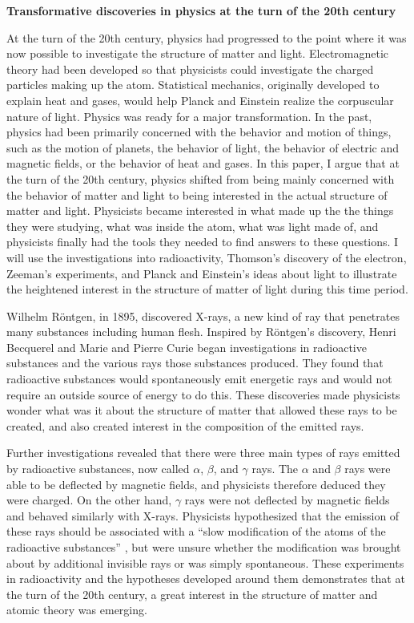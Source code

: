 \documentclass[12pt, oneside, letterpaper, fleqn]{article}
\begin{document}
\begin{center}
\textbf{Transformative discoveries in physics at the turn of the 20th
century}
\end{center}

At the turn of the 20th century, physics had progressed to the point
where it was now possible to investigate the structure of matter and
light. Electromagnetic theory had been developed so that physicists
could investigate the charged particles making up the atom. Statistical
mechanics, originally developed to explain heat and gases, would help
Planck and Einstein realize the corpuscular nature of light. Physics was
ready for a major transformation. In the past, physics had been
primarily concerned with the behavior and motion of things, such as the
motion of planets, the behavior of light, the behavior of electric and
magnetic fields, or the behavior of heat and gases. In this paper, I
argue that at the turn of the 20th century, physics shifted from being
mainly concerned with the behavior of matter and light to being
interested in the actual structure of matter and light. Physicists
became interested in what made up the the things they were studying,
what was inside the atom, what was light made of, and physicists finally
had the tools they needed to find answers to these questions. I will
use the investigations into radioactivity, Thomson's discovery of the
electron, Zeeman's experiments, and Planck and Einstein's ideas about
light to illustrate the heightened interest in the structure of matter
of light during this time period.

Wilhelm R\"ontgen, in 1895, discovered X-rays, a new kind of ray that
penetrates many substances including human flesh. Inspired by
R\"ontgen's discovery, Henri Becquerel and Marie and Pierre Curie began
investigations in radioactive substances and the various rays those
substances produced. They found that radioactive substances would
spontaneously emit energetic rays and would not require an outside
source of energy to do this. These discoveries made physicists wonder
what was it about the structure of matter that allowed these rays to be
created, and also created interest in the composition of the emitted
rays.

Further investigations revealed that there were three main types of rays
emitted by radioactive substances, now called $\alpha$, $\beta$, and
$\gamma$ rays. The $\alpha$ and $\beta$ rays were able to be deflected
by magnetic fields, and physicists therefore deduced they were charged.
On the other hand, $\gamma$ rays were not deflected by magnetic fields
and behaved similarly with X-rays. Physicists hypothesized that the
emission of these rays should be associated with a ``slow modification
of the atoms of the radioactive substances'' \cite{becquerel}, but were
unsure whether the modification was brought about by additional
invisible rays or was simply spontaneous. These experiments in
radioactivity and the hypotheses developed around them demonstrates that
at the turn of the 20th century, a great interest in the structure of
matter and atomic theory was emerging.
\end{document}
